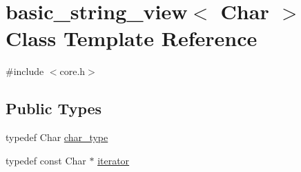 \hypertarget{classbasic__string__view}{}\section{basic\+\_\+string\+\_\+view$<$ Char $>$ Class Template Reference}
\label{classbasic__string__view}


{\ttfamily \#include $<$core.\+h$>$}

\subsection*{Public Types}
\begin{DoxyCompactItemize}
\item 
typedef Char \hyperlink{classbasic__string__view_a5c0ddf97eacf1624a31ecbb504e164f8}{char\+\_\+type}
\item 
typedef const Char $\ast$ \hyperlink{classbasic__string__view_aac52df0e56cb4b197372306e0da039e0}{iterator}
\end{DoxyCompactItemize}
